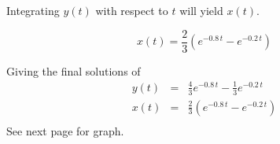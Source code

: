 \begin{questions}
{{\begin{solution}
\begin{multicols}{2}
Integrating $y(t)$ with respect to $t$ will yield $x(t)$.

$$x(t) = \frac{2}{3}\left(e^{-0.8\,t}-e^{-0.2\,t}\right)$$

Giving the final solutions of 
\begin{eqnarray*}
y(t) & = & \frac{4}{3}e^{-0.8\,t}-\frac{1}{3}e^{-0.2\,t}\\
x(t) & = & \frac{2}{3}\left(e^{-0.8\,t}-e^{-0.2\,t}\right)\\
\end{eqnarray*}
See next page for graph.

\end{multicols}
\vfill


\end{solution}}}
\end{questions}
\ifprintanswers
\begin{landscape}

\end{landscape}

\fi
